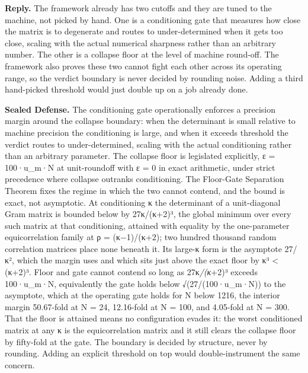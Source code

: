 \documentclass[10pt,twocolumn]{article}
\begin{document}
\textbf{Reply.} The framework already has two cutoffs and they are tuned
to the machine, not picked by hand. One is a conditioning gate that
measures how close the matrix is to degenerate and routes to
under-determined when it gets too close, scaling with the actual
numerical sharpness rather than an arbitrary number. The other is a
collapse floor at the level of machine round-off. The framework also
proves these two cannot fight each other across its operating range, so
the verdict boundary is never decided by rounding noise. Adding a third
hand-picked threshold would just double up on a job already done.

\textbf{Sealed Defense.} The conditioning gate operationally enforces a
precision margin around the collapse boundary: when the determinant is
small relative to machine precision the conditioning is large, and when
it exceeds threshold the verdict routes to under-determined, scaling
with the actual conditioning rather than an arbitrary parameter. The
collapse floor is legislated explicitly, ε = 100·u\_m·N at unit-roundoff
with ε = 0 in exact arithmetic, under strict precedence where collapse
outranks conditioning. The Floor-Gate Separation Theorem fixes the
regime in which the two cannot contend, and the bound is exact, not
asymptotic. At conditioning κ the determinant of a unit-diagonal Gram
matrix is bounded below by 27κ/(κ+2)³, the global minimum over every
such matrix at that conditioning, attained with equality by the
one-parameter equicorrelation family at ρ = (κ−1)/(κ+2); two hundred
thousand random correlation matrices place none beneath it. Its large-κ
form is the asymptote 27/κ², which the margin uses and which sits just
above the exact floor by κ³ \textless{} (κ+2)³. Floor and gate cannot
contend so long as 27κ\emph{/(κ}+2)³ exceeds 100·u\_m·N, equivalently
the gate holds below √(27/(100·u\_m·N)) to the asymptote, which at the
operating gate holds for N below 1216, the interior margin 50.67-fold at
N = 24, 12.16-fold at N = 100, and 4.05-fold at N = 300. That the floor
is attained means no configuration evades it: the worst conditioned
matrix at any κ is the equicorrelation matrix and it still clears the
collapse floor by fifty-fold at the gate. The boundary is decided by
structure, never by rounding. Adding an explicit threshold on top would
double-instrument the same concern.
\end{document}
